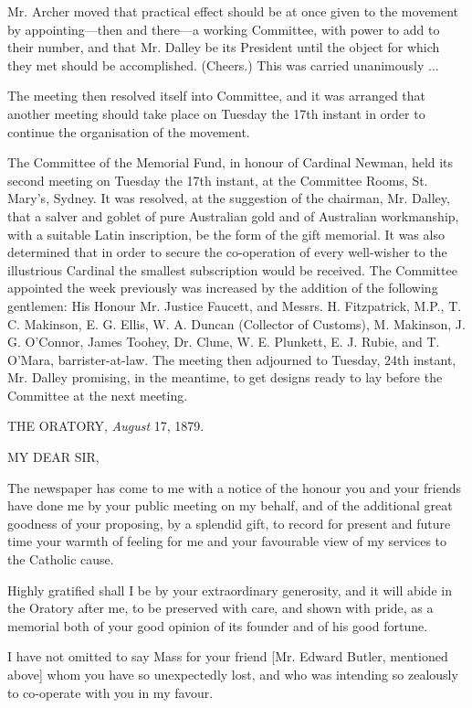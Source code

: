 Mr. Archer moved that practical effect should be at once given to
the movement by appointing—then and there—a working Committee,
with power to add to their number, and that Mr. Dalley be its
President until the object for which they met should be accomplished.
(Cheers.) This was carried unanimously ...

The meeting then resolved itself into Committee, and
it was arranged that another meeting should take place on Tuesday the
17th instant in order to continue the organisation of the movement.

The Committee of the Memorial Fund, in honour of Cardinal Newman,
held its second meeting on Tuesday the 17th instant, at the Committee
Rooms, St. Mary's, Sydney. It was resolved, at the suggestion of the
chairman, Mr. Dalley, that a salver and goblet of pure Australian gold
and of Australian workmanship, with a suitable Latin inscription, be
the form of the gift memorial. It was also determined that in order to
secure the co-operation of every well-wisher to the illustrious
Cardinal the smallest subscription would be received. The Committee
appointed the week previously was increased by the addition of the
following gentlemen: His Honour Mr. Justice Faucett, and Messrs. H.
Fitzpatrick, M.P., T. C. Makinson, E. G. Ellis, W. A. Duncan
(Collector of Customs), M. Makinson, J. G. O'Connor, James Toohey, Dr.
Clune, W. E. Plunkett, E. J. Rubie, and T. O'Mara, barrister-at-law.
The meeting then adjourned to Tuesday, 24th instant, Mr. Dalley
promising, in the meantime, to get designs ready to lay before the
Committee at the next meeting.


THE ORATORY, \emph{August}
17, 1879.

MY DEAR SIR,

The newspaper has come to me with a notice of the honour you and your
friends have done me by your public meeting on my behalf, and of the
additional great goodness of your proposing, by a splendid gift, to
record for present and future time your warmth of feeling for me and
your favourable view of my services to the Catholic cause.

Highly gratified shall I be by your extraordinary generosity, and
it will abide in the Oratory after me, to be preserved with care, and
shown with pride, as a memorial both of your good opinion of its
founder and of his good fortune.

I have not omitted to say Mass for your friend [Mr. Edward Butler,
mentioned above] whom you have so unexpectedly lost, and who was
intending so zealously to co-operate with you in my favour.

